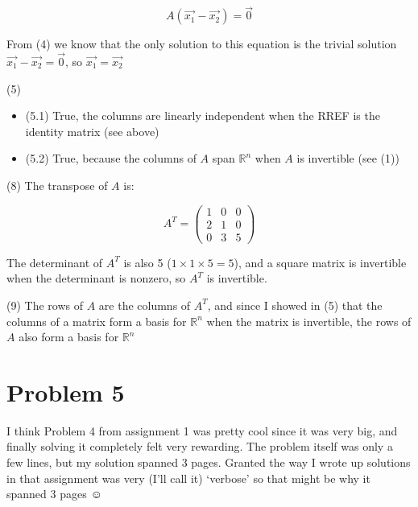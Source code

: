 \documentclass[11pt, a4paper]{article}
\begin{document}
\[
A (\vec{x_1} - \vec{x_2}) = \vec{0}
\]

From (4) we know that the only solution to this equation is the trivial solution $\vec{x_1} - \vec{x_2} = \vec{0}$, so $\vec{x_1} = \vec{x_2}$

(5)

\begin{itemize}
	\item (5.1) True, the columns are linearly independent when the RREF is the identity matrix (see above)
	\item (5.2) True, because the columns of $A$ span ${\mathbb{R}}^n$ when $A$ is invertible (see (1))
\end{itemize}

(8) The transpose of $A$ is:

\[
{A}^T = \begin{pmatrix}
	1 & 0 & 0 \\
	2 & 1 & 0 \\
	0 & 3 & 5
\end{pmatrix}
\]

The determinant of ${A}^T$ is also 5 ($1 \times 1 \times 5 = 5$), and a square matrix is invertible when the determinant is nonzero, so ${A}^T$ is invertible.

(9) The rows of $A$ are the columns of ${A}^T$, and since I showed in (5) that the columns of a matrix form a basis for ${\mathbb{R}}^n$ when the matrix is invertible, the rows of $A$ also form a basis for ${\mathbb{R}}^n$




\pagebreak
\section*{Problem 5}

I think Problem 4 from assignment 1 was pretty cool since it was very big, and finally solving it completely felt very rewarding. The problem itself was only a few lines, but my solution spanned 3 pages. Granted the way I wrote up solutions in that assignment was very (I'll call it) `verbose' so that might be why it spanned 3 pages $\smiley$
\end{document}

